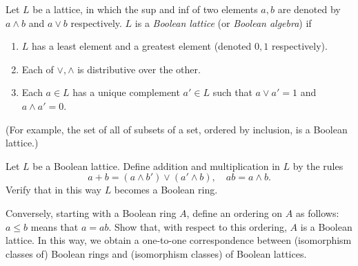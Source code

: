 \documentclass{article}
\begin{document}
\begin{exercise} \label{ex1-24}
    Let \(L\) be a lattice, in which the sup and inf of two elements \(a, b\) are denoted by \(a \land b\) and \(a \lor b\) respectively.
    \(L\) is a \textit{Boolean lattice} (or \textit{Boolean algebra}) if
    \begin{enumerate}
        \item
            \(L\) has a least element and a greatest element (denoted \(0, 1\) respectively).
        \item
            Each of \(\lor, \land\) is distributive over the other.
        \item
            Each \(a \in L\) has a unique complement \(a' \in L\) such that \(a \lor a' = 1\) and \(a \land a' = 0\).
    \end{enumerate}
    (For example, the set of all of subsets of a set, ordered by inclusion, is a Boolean lattice.)

    Let \(L\) be a Boolean lattice.
    Define addition and multiplication in \(L\) by the rules
    \[
        a + b = (a \land b') \lor (a' \land b), \quad ab = a \land b.
    \]
    Verify that in this way \(L\) becomes a Boolean ring.

    Conversely, starting with a Boolean ring \(A\), define an ordering on \(A\) as follows: \(a \leq b\) means that \(a = ab\).
    Show that, with respect to this ordering, \(A\) is a Boolean lattice.
    In this way, we obtain a one-to-one correspondence between (isomorphism classes of) Boolean rings and (isomorphism classes) of Boolean lattices.
\end{exercise}
\end{document}
